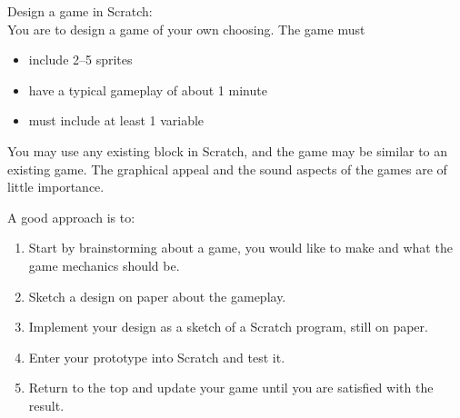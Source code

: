 Design a game in Scratch:\\
You are to design a game of your own choosing. The game must
\begin{itemize}
\item include 2--5 sprites 
\item have a typical gameplay of about 1 minute
\item must include at least 1 variable
\end{itemize}
You may use any existing block in Scratch, and the game may be similar
to an existing game. The graphical appeal and the sound aspects of the
games are of little importance.

A good approach is to:
\begin{enumerate}
\item Start by brainstorming about a game, you would like to make
  and what the game mechanics should be.
\item Sketch a design on paper about the gameplay.
\item Implement your design as a sketch of a Scratch program, still on paper.
\item Enter your prototype into Scratch and test it.
\item Return to the top and update your game until you are satisfied with the result.
\end{enumerate}